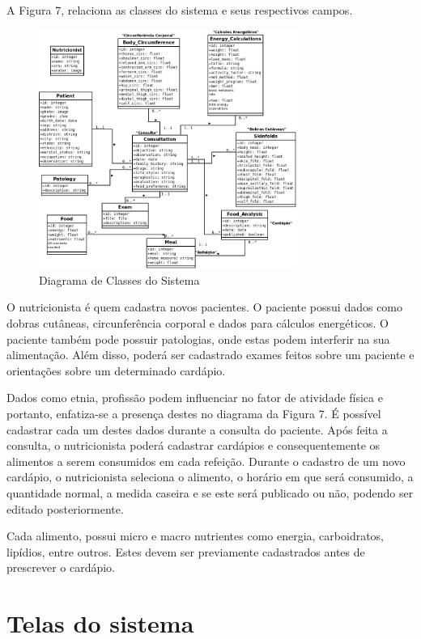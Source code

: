 \documentclass[
	12pt,				%
    oneside,			%
	a4paper,			%
	english,			%
	french,				%
	spanish,			%
	brazil,				%
	]{abntex2}
\begin{document}
A Figura 7, relaciona as classes do sistema e seus respectivos campos.

\begin{figure} [hbt] 
\begin{center}
\includegraphics[width=0.75\textwidth]{bd-sistema.jpeg}
\end{center}
\label{diagClass1} 
\caption{Diagrama de Classes do Sistema}
\end{figure}

O nutricionista é quem cadastra novos pacientes. O paciente possui dados como
dobras cutâneas, circunferência corporal e dados para cálculos energéticos. O
paciente também pode possuir patologias, onde estas podem interferir na sua
alimentação. Além disso, poderá ser cadastrado exames feitos sobre um paciente e
orientações sobre um determinado cardápio. 

Dados como etnia, profissão podem influenciar no fator de atividade física e portanto,
enfatiza-se a presença destes no diagrama da Figura 7. É possível cadastrar cada um destes
dados durante a consulta do paciente. Após feita a consulta, o nutricionista poderá
cadastrar cardápios e consequentemente os alimentos a serem consumidos em cada refeição.
Durante o cadastro de um novo cardápio, o nutricionista seleciona o alimento,
o horário em que será consumido, a quantidade normal, a medida caseira e se este
será publicado ou não, podendo ser editado posteriormente.

Cada alimento, possui micro e macro nutrientes como energia, carboidratos,
lipídios, entre outros. Estes devem ser previamente cadastrados antes de prescrever o
cardápio.

\section{Telas do sistema}
\end{document}
